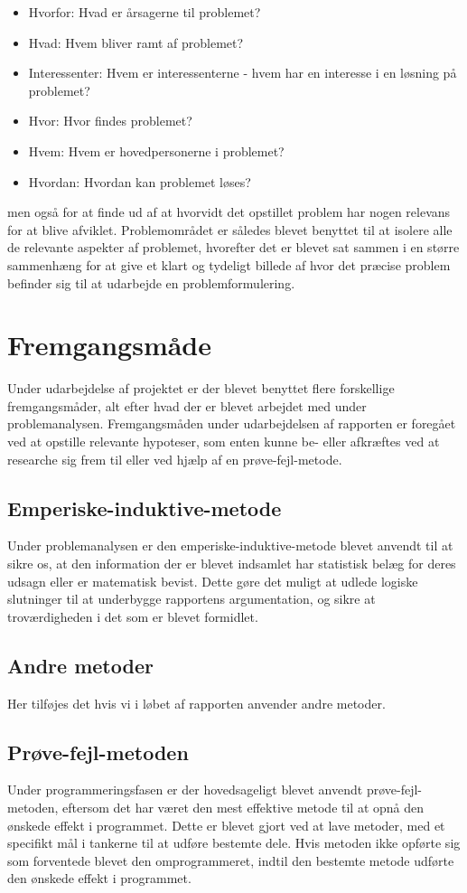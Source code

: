 \begin{itemize}
\item Hvorfor: Hvad er årsagerne til problemet?
\item Hvad: Hvem bliver ramt af problemet?
\item Interessenter: Hvem er interessenterne - hvem har en interesse i en løsning på problemet?
\item Hvor: Hvor findes problemet?
\item Hvem: Hvem er hovedpersonerne i problemet?
\item Hvordan: Hvordan kan problemet løses?
\end{itemize}
men også for at finde ud af at hvorvidt det opstillet problem har nogen relevans for at blive afviklet. Problemområdet er således blevet benyttet til at isolere alle de relevante aspekter af problemet, hvorefter det er blevet sat sammen i en større sammenhæng for at give et klart og tydeligt billede af hvor det præcise problem befinder sig til at udarbejde en problemformulering.

\section{Fremgangsmåde}
Under udarbejdelse af projektet er der blevet benyttet flere forskellige fremgangsmåder, alt efter hvad der er blevet arbejdet med under problemanalysen. Fremgangsmåden under udarbejdelsen af rapporten er foregået ved at opstille relevante hypoteser, som enten kunne be- eller afkræftes ved at researche sig frem til eller ved hjælp af en prøve-fejl-metode.

\subsection{Emperiske-induktive-metode}
Under problemanalysen er den emperiske-induktive-metode blevet anvendt til at sikre os, at den information der er blevet indsamlet har statistisk belæg for deres udsagn eller er matematisk bevist. Dette gøre det muligt at udlede logiske slutninger til at underbygge rapportens argumentation, og sikre at troværdigheden i det som er blevet formidlet.

\subsection{Andre metoder}
Her tilføjes det hvis vi i løbet af rapporten anvender andre metoder. 

\subsection{Prøve-fejl-metoden}
Under programmeringsfasen er der hovedsageligt blevet anvendt prøve-fejl-metoden, eftersom det har været den mest effektive metode til at opnå den ønskede effekt i programmet. Dette er blevet gjort ved at lave metoder, med et specifikt mål i tankerne til at udføre bestemte dele. Hvis metoden ikke opførte sig som forventede blevet den omprogrammeret, indtil den bestemte metode udførte den ønskede effekt i programmet.


